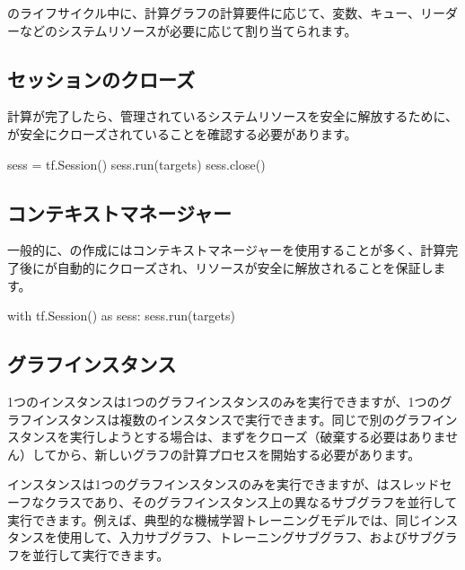 \begin{content}

のライフサイクル中に、計算グラフの計算要件に応じて、変数、キュー、リーダーなどのシステムリソースが必要に応じて割り当てられます。

\subsection{セッションのクローズ}

計算が完了したら、管理されているシステムリソースを安全に解放するために、が安全にクローズされていることを確認する必要があります。

\begin{leftbar}
\begin{python}
sess = tf.Session()
sess.run(targets)
sess.close()
\end{python}
\end{leftbar}

\subsection{コンテキストマネージャー}

一般的に、の作成にはコンテキストマネージャーを使用することが多く、計算完了後にが自動的にクローズされ、リソースが安全に解放されることを保証します。

\begin{leftbar}
\begin{python}
with tf.Session() as sess:
  sess.run(targets)
\end{python}
\end{leftbar}

\subsection{グラフインスタンス}

1つのインスタンスは1つのグラフインスタンスのみを実行できますが、1つのグラフインスタンスは複数のインスタンスで実行できます。同じで別のグラフインスタンスを実行しようとする場合は、まずをクローズ（破棄する必要はありません）してから、新しいグラフの計算プロセスを開始する必要があります。

インスタンスは1つのグラフインスタンスのみを実行できますが、はスレッドセーフなクラスであり、そのグラフインスタンス上の異なるサブグラフを並行して実行できます。例えば、典型的な機械学習トレーニングモデルでは、同じインスタンスを使用して、入力サブグラフ、トレーニングサブグラフ、およびサブグラフを並行して実行できます。


\end{content}
